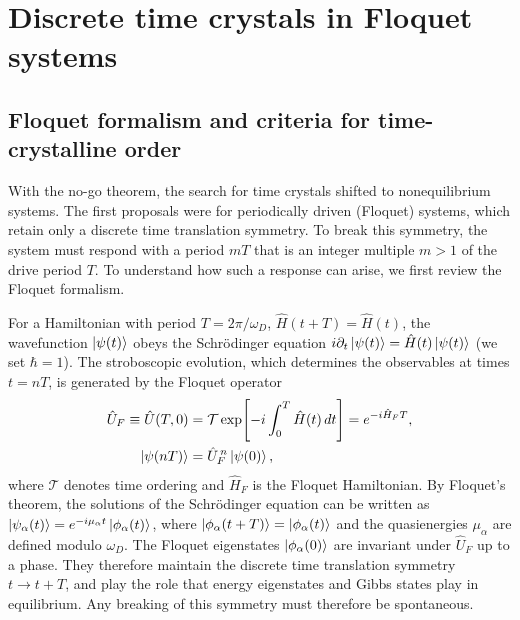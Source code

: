 \documentclass[%
reprint,
superscriptaddress,
amsmath,amssymb,
aps,
prb,
showkeys,%
floatfix,
]{revtex4-2}
\begin{document}
	\section{\label{sec:floquet}Discrete time crystals in Floquet systems}
	
	\subsection{\label{sec:background}Floquet formalism and criteria for time-crystalline order}
	
	With the no-go theorem, the search for time crystals shifted to nonequilibrium systems. The first proposals were for periodically driven (Floquet) systems, which retain only a discrete time translation symmetry. To break this symmetry, the system must respond with a period $mT$ that is an integer multiple $m>1$ of the drive period $T$. To understand how such a response can arise, we first review the Floquet formalism.
	
	For a Hamiltonian with period $T=2\pi/\omega_D$, $\hat{H}(t+T)=\hat{H}(t)$, the wavefunction $\ket{\psi(t)}$ obeys the Schr\"odinger equation $i\partial_t\ket{\psi(t)}=\hat{H}(t)\ket{\psi(t)}$ (we set $\hbar=1$). The stroboscopic evolution, which determines the observables at times $t=nT$, is generated by the Floquet operator
	\begin{equation}
		\begin{aligned}
			\hat{U}_F\equiv\hat{U}(T,0)&=\mathcal{T}\exp\!\left[-i\int_0^T \hat{H}(t)\,dt\right]
			=e^{-i\hat{H}_FT},\\
			\ket{\psi(nT)}&=\hat{U}_F^{\,n}\ket{\psi(0)},
		\end{aligned}
		\label{eq:UF}
	\end{equation}
	where $\mathcal{T}$ denotes time ordering and $\hat{H}_F$ is the Floquet Hamiltonian. By Floquet's theorem, the solutions of the Schr\"odinger equation can be written as $\ket{\psi_\alpha(t)}=e^{-i\mu_\alpha t}\ket{\phi_\alpha(t)}$, where $\ket{\phi_\alpha(t+T)}=\ket{\phi_\alpha(t)}$ and the quasienergies $\mu_\alpha$ are defined modulo $\omega_D$. The Floquet eigenstates $\ket{\phi_\alpha(0)}$ are invariant under $\hat{U}_F$ up to a phase. They therefore maintain the discrete time translation symmetry $t\to t+T$, and play the role that energy eigenstates and Gibbs states play in equilibrium. Any breaking of this symmetry must therefore be spontaneous.
	
\end{document}
